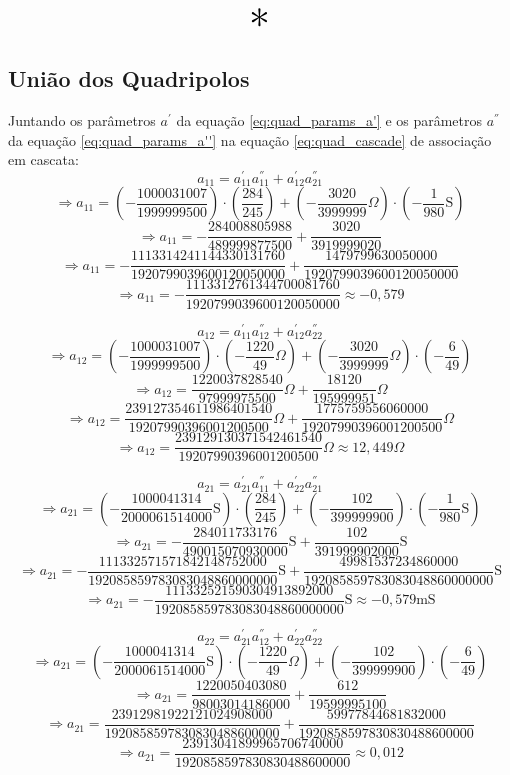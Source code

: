 \documentclass{report}
\begin{document}
\begin{center}
    \[ \scalebox{3}{$ * $} \]
\end{center}

\subsection{União dos Quadripolos}

Juntando os parâmetros $ a^{'} $ da equação \ref{eq:quad_params_a'} e os parâmetros $ a^{''} $ da equação \ref{eq:quad_params_a''} na equação \ref{eq:quad_cascade} de
associação em cascata:
$$ a_{11} = a^{'}_{11}a^{''}_{11} + a^{'}_{12}a^{''}_{21} $$
$$ \Rightarrow a_{11} = \left(- \frac{1000031007}{1999999500}\right) \cdot \left(\frac{284}{245}\right) + \left(- \frac{3020}{3999999} \Omega\right) \cdot \left(- \frac{1}{980}\text{S}\right) $$
$$ \Rightarrow a_{11} = - \frac{284008805988}{489999877500} + \frac{3020}{3919999020} $$
$$ \Rightarrow a_{11} = - \frac{1113314241144330131760}{1920799039600120050000} + \frac{1479799630050000}{1920799039600120050000} $$
$$ \Rightarrow a_{11} = - \frac{1113312761344700081760}{1920799039600120050000} \approx -0,\!579 $$

$$ a_{12} = a^{'}_{11}a^{''}_{12} + a^{'}_{12}a^{''}_{22} $$
$$ \Rightarrow a_{12} = \left(- \frac{1000031007}{1999999500}\right) \cdot \left(- \frac{1220}{49} \Omega\right) + \left(- \frac{3020}{3999999} \Omega\right) \cdot \left(- \frac{6}{49}\right) $$
$$ \Rightarrow a_{12} = \frac{1220037828540}{97999975500} \Omega + \frac{18120}{195999951} \Omega $$
$$ \Rightarrow a_{12} = \frac{239127354611986401540}{19207990396001200500} \Omega + \frac{1775759556060000}{19207990396001200500} \Omega $$
$$ \Rightarrow a_{12} = \frac{239129130371542461540}{19207990396001200500} \Omega \approx 12,\!449 \Omega $$

$$ a_{21} = a^{'}_{21}a^{''}_{11} + a^{'}_{22}a^{''}_{21} $$
$$ \Rightarrow a_{21} = \left(- \frac{1000041314}{2000061514000} \text{S}\right) \cdot \left(\frac{284}{245}\right) + \left(- \frac{102}{399999900}\right) \cdot \left(- \frac{1}{980}\text{S}\right) $$
$$ \Rightarrow a_{21} = - \frac{284011733176}{490015070930000} \text{S} + \frac{102}{391999902000}\text{S} $$
$$ \Rightarrow a_{21} = - \frac{111332571571842148752000}{192085859783083048860000000} \text{S} + \frac{49981537234860000}{192085859783083048860000000}\text{S} $$
$$ \Rightarrow a_{21} = - \frac{111332521590304913892000}{192085859783083048860000000} \text{S} \approx - 0,\!579 \text{mS} $$

$$ a_{22} = a^{'}_{21}a^{''}_{12} + a^{'}_{22}a^{''}_{22} $$
$$ \Rightarrow a_{21} = \left(- \frac{1000041314}{2000061514000} \text{S}\right) \cdot \left(- \frac{1220}{49} \Omega\right) + \left(- \frac{102}{399999900}\right) \cdot \left(- \frac{6}{49}\right) $$
$$ \Rightarrow a_{21} = \frac{1220050403080}{98003014186000} + \frac{612}{19599995100} $$
$$ \Rightarrow a_{21} = \frac{23912981922121024908000}{1920858597830830488600000} + \frac{59977844681832000}{1920858597830830488600000} $$
$$ \Rightarrow a_{21} = \frac{23913041899965706740000}{1920858597830830488600000} \approx 0,\!012 $$
\end{document}

